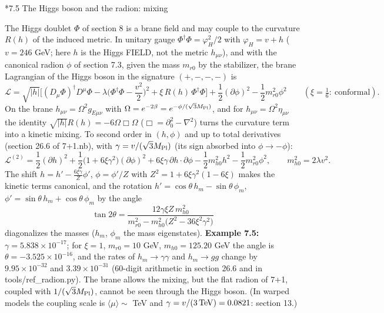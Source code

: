 \documentclass[10pt,a4paper]{article}
\makeatletter
\renewcommand\subsection{\@startsection{subsection}{2}{\z@}{-3.25ex\@plus -1ex \@minus -.2ex}{1.5ex \@plus .2ex}{\normalfont\large\bfseries\raggedright}}
\makeatother
\begin{document}
\subsection*{7.5 The Higgs boson and the radion: mixing}
The Higgs doublet $\Phi$ of section 8 is a brane field and may couple to the curvature $R(h)$ of the induced metric. In unitary gauge $\Phi^\dagger\Phi=\varphi_H^2/2$ with $\varphi_H=v+h$ ($v=246$ GeV; here $h$ is the Higgs FIELD, not the metric $h_{\mu\nu}$), and with the canonical radion $\phi$ of section 7.3, given the mass $m_{r0}$ by the stabilizer, the brane Lagrangian of the Higgs boson in the signature $(+,-,-,-)$ is
\begin{equation*}
\mathcal L=\sqrt{|h|}\Big[(D_\mu\Phi)^\dagger D^\mu\Phi-\lambda\Big(\Phi^\dagger\Phi-\frac{v^2}2\Big)^2+\xi\,R(h)\,\Phi^\dagger\Phi\Big]+\frac12(\partial\phi)^2-\frac12m_{r0}^2\phi^2\qquad(\xi=\tfrac16:\ \text{conformal}).
\end{equation*}
On the brane $h_{\mu\nu}=\Omega^2g_{E\mu\nu}$ with $\Omega=e^{-2\beta}=e^{-\phi/(\sqrt3M_{\rm Pl})}$, and for $h_{\mu\nu}=\Omega^2\eta_{\mu\nu}$ the identity $\sqrt{|h|}R(h)=-6\Omega\Box\Omega$ ($\Box=\partial_0^2-\nabla^2$) turns the curvature term into a kinetic mixing. To second order in $(h,\phi)$ and up to total derivatives (section 26.6 of 7+1.nb), with $\gamma=v/(\sqrt3M_{\rm Pl})$ (its sign absorbed into $\phi\to-\phi$):
\begin{equation*}
\mathcal L^{(2)}=\frac12(\partial h)^2+\frac12\big(1+6\xi\gamma^2\big)(\partial\phi)^2+6\xi\gamma\,\partial h\cdot\partial\phi-\frac12m_{h0}^2h^2-\frac12m_{r0}^2\phi^2,\qquad m_{h0}^2=2\lambda v^2 .
\end{equation*}
The shift $h=h'-\frac{6\xi\gamma}Z\phi'$, $\phi=\phi'/Z$ with $Z^2=1+6\xi\gamma^2(1-6\xi)$ makes the kinetic terms canonical, and the rotation $h'=\cos\theta\,h_m-\sin\theta\,\phi_m$, $\phi'=\sin\theta\,h_m+\cos\theta\,\phi_m$ by the angle
\begin{equation*}
\tan2\theta=\frac{12\gamma\xi Z\,m_{h0}^2}{m_{r0}^2-m_{h0}^2\big(Z^2-36\xi^2\gamma^2\big)}
\end{equation*}
diagonalizes the masses ($h_m$, $\phi_m$ the mass eigenstates). \textbf{Example 7.5:} $\gamma=5.838\times10^{-17}$; for $\xi=1$, $m_{r0}=10$ GeV, $m_{h0}=125.20$ GeV the angle is $\theta=-3.525\times10^{-16}$, and the rates of $h_m\to\gamma\gamma$ and $h_m\to gg$ change by $9.95\times10^{-32}$ and $3.39\times10^{-31}$ (60-digit arithmetic in section 26.6 and in tools/ref\_radion.py). The brane allows the mixing, but the flat radion of 7+1, coupled with $1/(\sqrt3M_{\rm Pl})$, cannot be seen through the Higgs boson. (In warped models the coupling scale is $\langle\mu\rangle\sim$ TeV and $\gamma=v/(3\,{\rm TeV})=0.0821$: section 13.)
\end{document}
